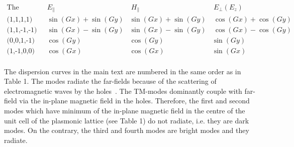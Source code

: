 \documentclass[aps,pra,amsmath,amssymb,onecolumn,superscriptaddress,showpacs,floatfix,]{revtex4-1}
\begin{document}
$\begin{array}{cccc}
\text{The eigenvector} & E_{\parallel} & \
H_{\parallel} & \
E_ {\perp } \left( E_z \right) \\
\text{(1,1,1,1)} & \sin (G x)+\sin (G y) & \sin (G x)+\sin (G y) & \
\cos (G x)+\cos (G y) \\
\text{(1,1,-1,-1)} & \sin (G x)-\sin (G y) & \sin (G x)-\sin (G y) & \
\cos (G x)-\cos (G y) \\
\text{(0,0,1,-1)} & \cos (G y) & \cos (G y) & \sin (G y) \\
\text{(1,-1,0,0)} & \cos (G x) & \cos (G x) & \sin (G x) \\
\end{array}$

The dispersion curves in the main text are numbered in the same order as in Table 1.
The modes radiate the far-fields because of the scattering of electromagnetic waves by the holes~\cite{TennerJOpt}. 
The TM-modes dominantly couple with far-field via the in-plane magnetic field in the holes.
Therefore, the first and second modes which have minimum of the in-plane magnetic field in the centre of the unit cell of the plasmonic lattice (see Table 1) do not radiate, i.e. they are dark modes. 
On the contrary, the third and fourth modes are bright modes and they radiate.


\end{document}
